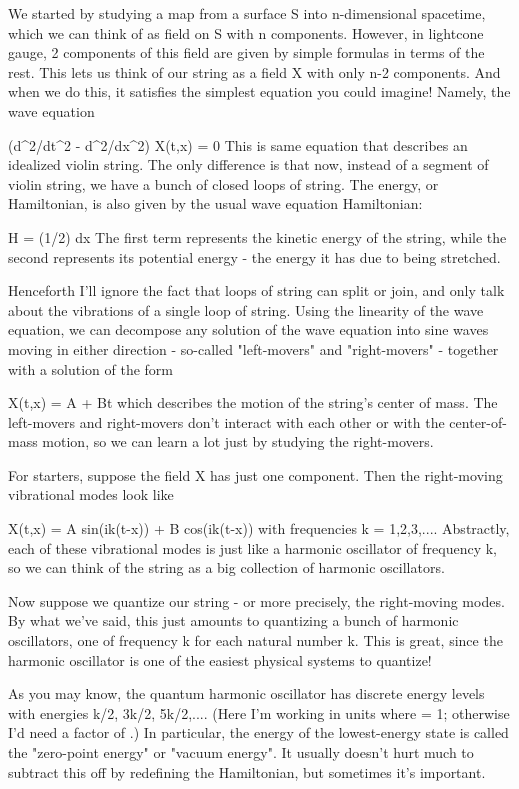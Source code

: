 We started by studying a map from a surface S into n-dimensional
spacetime, which we can think of as field on S with n components. 
However, in lightcone gauge, 2 components of this field are given by
simple formulas in terms of the rest.  This lets us think of our string
as a field X with only n-2 components.  And when we do this, it
satisfies the simplest equation you could imagine!  Namely, the wave
equation

  (d^{2}/dt^{2} - d^{2}/dx^{2}) X(t,x) = 0
This is same equation that describes an idealized violin string.   The
only difference is that now, instead of a segment of violin string, we
have a bunch of closed loops of string.  The energy, or Hamiltonian,
is also given by the usual wave equation Hamiltonian:

  H = (1/2) \int  [(dX/dt)^{2} + (dX/dx)^{2}] dx
The first term represents the kinetic energy of the string, while
the second represents its potential energy - the energy it has due
to being stretched.

Henceforth I'll ignore the fact that loops of string can split or join,
and only talk about the vibrations of a single loop of string.  Using
the linearity of the wave equation, we can decompose any solution of the
wave equation into sine waves moving in either direction - so-called 
"left-movers" and "right-movers" - together with a solution of the form

                         X(t,x) = A + Bt
which describes the motion of the string's center of mass.  The
left-movers and right-movers don't interact with each other or
with the center-of-mass motion, so we can learn a lot just by studying
the right-movers.  

For starters, suppose the field X has just one component.  Then the
right-moving vibrational modes look like

              X(t,x) = A sin(ik(t-x)) + B cos(ik(t-x))
with frequencies k = 1,2,3,....  Abstractly, each of these vibrational
modes is just like a harmonic oscillator of frequency k, so we can think
of the string as a big collection of harmonic oscillators.  

Now suppose we quantize our string - or more precisely, the right-moving
modes.  By what we've said, this just amounts to quantizing a bunch of 
harmonic oscillators, one of frequency k for each natural number k.  This
is great, since the harmonic oscillator is one of the easiest physical
systems to quantize!  

As you may know, the quantum harmonic oscillator has discrete energy
levels with energies k/2, 3k/2, 5k/2,....  (Here I'm working in units
where \hbar  = 1; otherwise I'd need a factor of \hbar .)  In particular,
the energy of the lowest-energy state is called the "zero-point
energy" or "vacuum energy".  It usually doesn't hurt much
to subtract this off by redefining the Hamiltonian, but sometimes it's
important.

